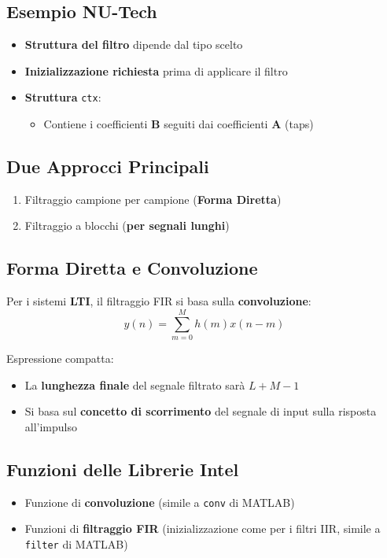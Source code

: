 \subsection{Esempio NU-Tech}
\begin{itemize}
    \item \textbf{Struttura del filtro} dipende dal tipo scelto
    \item \textbf{Inizializzazione richiesta} prima di applicare il filtro
    \item \textbf{Struttura} \texttt{ctx}:
    \begin{itemize}
        \item Contiene i coefficienti \textbf{B} seguiti dai coefficienti \textbf{A} (taps)
    \end{itemize}
\end{itemize}

\subsection{Due Approcci Principali}
\begin{enumerate}
    \item Filtraggio campione per campione (\textbf{Forma Diretta})
    \item Filtraggio a blocchi (\textbf{per segnali lunghi})
\end{enumerate}

\subsection{Forma Diretta e Convoluzione}
Per i sistemi \textbf{LTI}, il filtraggio FIR si basa sulla \textbf{convoluzione}:
\[
    y(n) = \sum_{m=0}^{M} h(m)x(n-m)
\]

\noindent Espressione compatta:
\begin{itemize}
    \item La \textbf{lunghezza finale} del segnale filtrato sarà \(L + M - 1\)
    \item Si basa sul \textbf{concetto di scorrimento} del segnale di input sulla risposta all’impulso
\end{itemize}

\subsection{Funzioni delle Librerie Intel}
\begin{itemize}
    \item Funzione di \textbf{convoluzione} (simile a \texttt{conv} di MATLAB)
    \item Funzioni di \textbf{filtraggio FIR} (inizializzazione come per i filtri IIR, simile a \texttt{filter} di MATLAB)
\end{itemize}

